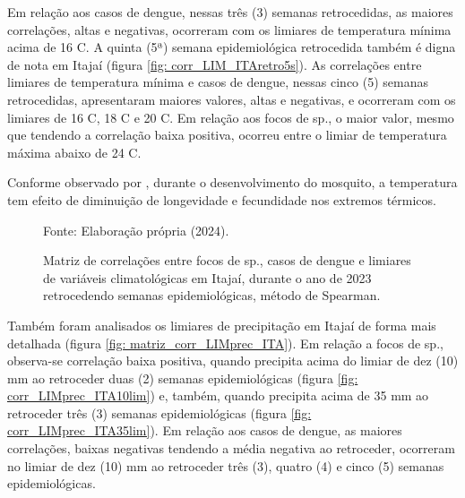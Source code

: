 
\indent Em relação aos casos de dengue, nessas três (3) semanas retrocedidas, as maiores correlações, altas e negativas, ocorreram com os limiares de temperatura mínima acima de 16 C.  A quinta (5ª) semana epidemiológica retrocedida também é digna de nota em Itajaí (figura \ref{fig: corr_LIM_ITAretro5s}). As correlações entre limiares de temperatura mínima e casos de dengue, nessas cinco (5) semanas retrocedidas, apresentaram maiores valores, altas e negativas, e ocorreram com os limiares de 16 C, 18 C e 20 C. Em relação aos focos de  sp., o maior valor, mesmo que tendendo a correlação baixa positiva, ocorreu entre o limiar de temperatura máxima abaixo de 24 C.

\indent Conforme observado por , durante o desenvolvimento do mosquito, a temperatura tem efeito de diminuição de longevidade e fecundidade nos extremos térmicos. 

\begin{figure}[htbp]
    \begin{center}
    \caption{Matriz de correlações entre focos de  sp., casos de dengue e limiares de variáveis climatológicas em Itajaí, durante o ano de 2023 retrocedendo semanas epidemiológicas, método de Spearman.}
    \label{fig: matriz_corr_LIM_ITAretro}
        \hfill
    \end{center}
    \small{Fonte: Elaboração própria (2024).}
\end{figure}

\indent Também foram analisados os limiares de precipitação em Itajaí de forma mais detalhada (figura \ref{fig: matriz_corr_LIMprec_ITA}). Em relação a focos de  sp., observa-se correlação baixa positiva, quando precipita acima do limiar de dez (10) mm ao retroceder duas (2) semanas epidemiológicas (figura \ref{fig: corr_LIMprec_ITA10lim}) e, também, quando precipita acima de 35 mm ao retroceder três (3) semanas epidemiológicas (figura \ref{fig: corr_LIMprec_ITA35lim}). Em relação aos casos de dengue, as maiores correlações, baixas negativas tendendo a média negativa ao retroceder, ocorreram no limiar de dez (10) mm ao retroceder três (3), quatro (4) e cinco (5) semanas epidemiológicas.

